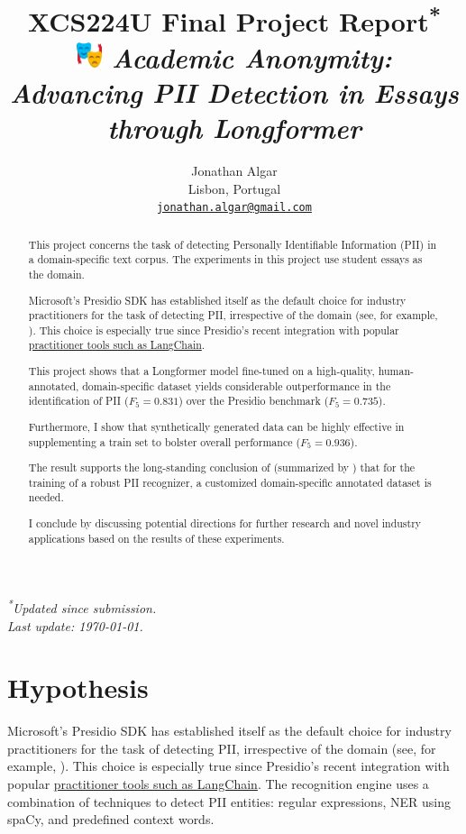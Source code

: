 \documentclass[11pt]{article}
\title{%
  XCS224U Final Project Report\textsuperscript{*} \\
  \includegraphics[height=1em]{images/emoji.png}%
  \hspace{0.1em} \textit{Academic Anonymity: Advancing PII Detection in Essays through Longformer}%
}
\author{Jonathan Algar \\
  Lisbon, Portugal \\
  \texttt{\href{mailto:jonathan.algar@gmail.com}{jonathan.algar@gmail.com}}
}
\begin{document}
\maketitle
\vspace{-1em}
\begin{center}
\small\textit{\textsuperscript{*}{Updated since submission. \\ Last update: \today}.}
\end{center}

\begin{abstract}

This project concerns the task of detecting Personally Identifiable Information (PII) in a domain-specific text corpus. The experiments in this project use student essays as the domain.

Microsoft's Presidio SDK \cite{Presidio} has established itself as the default choice for industry practitioners for the task of detecting PII, irrespective of the domain (see, for example, \citealt{AzizStraiton2023PIIDetection}). This choice is especially true since Presidio's recent integration with popular \href{https://python.langchain.com/docs/guides/productionization/safety/presidio_data_anonymization/}{practitioner tools such as LangChain}.

This project shows that a Longformer model \cite{abs-2004-05150} fine-tuned on a high-quality, human-annotated, domain-specific dataset yields considerable outperformance in the identification of PII ($F_5 = 0.831$) over the Presidio benchmark ($F_5 = 0.735$).

Furthermore, I show that synthetically generated data can be highly effective in supplementing a train set to bolster overall performance ($F_5 = 0.936$).

The result supports the long-standing conclusion of \citealt{Chen2015ASO} (summarized by \citealt{hathurusinghe-etal-2021-privacy}) that for the training of a robust PII recognizer, a customized domain-specific annotated dataset is needed.

I conclude by discussing potential directions for further research and novel industry applications based on the results of these experiments.

\end{abstract}

\section{Hypothesis}

Microsoft's Presidio SDK \cite{Presidio} has established itself as the default choice for industry practitioners for the task of detecting PII, irrespective of the domain (see, for example, \citealt{AzizStraiton2023PIIDetection}). This choice is especially true since Presidio's recent integration with popular \href{https://python.langchain.com/docs/guides/productionization/safety/presidio_data_anonymization/}{practitioner tools such as LangChain}. The recognition engine uses a combination of techniques to detect PII entities: regular expressions, NER using spaCy, and predefined context words.
\end{document}
